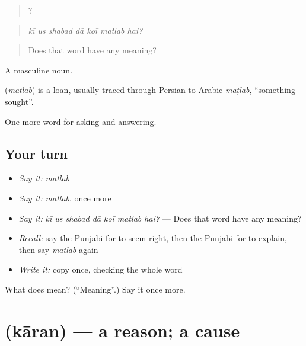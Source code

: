 \begin{quote}
      ?
\end{quote}

\begin{quote}
\emph{kī us shabad dā koī matlab hai?}
\end{quote}

\begin{quote}
Does that word have any meaning?
\end{quote}

A masculine noun.

\begin{cousinweb}
\textbf{} (\emph{matlab}) is a loan, usually traced through Persian to Arabic \emph{maṭlab}, \textquotedblleft{}something sought\textquotedblright{}.
\end{cousinweb}

\begin{grammarlens}[title={What you've built}]
One more word for asking and answering.
\end{grammarlens}

\subsection*{Your turn}
\begin{itemize}
\raggedright
  \item \emph{Say it:} \emph{matlab}
  \item \emph{Say it:} \emph{matlab}, once more
  \item \emph{Say it:} \emph{kī us shabad dā koī matlab hai?} — Does that word have any meaning?
  \item \emph{Recall:} say the Punjabi for to seem right, then the Punjabi for to explain, then say \emph{matlab} again
  \item \emph{Write it:} copy \textbf{} once, checking the whole word
\end{itemize}

\begin{tcolorbox}[breakable,colback=teal!4,colframe=teal!35!black,title={Before you move on}]
What does  mean? (\textquotedblleft{}Meaning\textquotedblright{}.) Say it once more.
\end{tcolorbox}
\section[\texorpdfstring{\pa{ਕਾਰਨ} (kāran)}{ਕਾਰਨ (kāran)}]{ (kāran) — a reason; a cause}

